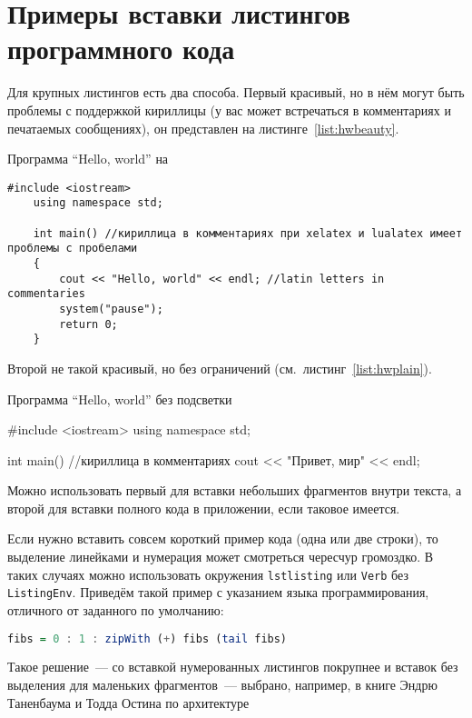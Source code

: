 \iffalse
\chapter{Примеры вставки листингов программного кода} \label{AppendixA}

Для крупных листингов есть два способа. Первый красивый, но в нём могут быть проблемы с поддержкой кириллицы (у вас может встречаться в комментариях и
печатаемых сообщениях), он представлен на листинге~\ref{list:hwbeauty}.
\begin{ListingEnv}[!h]%
    \caption{Программа “Hello, world” на \protect\cpp}
    \label{list:hwbeauty}
    \begin{lstlisting}[language={[ISO]C++}]
	#include <iostream>
	using namespace std;

	int main() //кириллица в комментариях при xelatex и lualatex имеет проблемы с пробелами
	{
		cout << "Hello, world" << endl; //latin letters in commentaries
		system("pause");
		return 0;
	}
    \end{lstlisting}
\end{ListingEnv}%
Второй не такой красивый, но без ограничений (см.~листинг~\ref{list:hwplain}).
\begin{ListingEnv}[!h]
    \caption{Программа “Hello, world” без подсветки}
    \label{list:hwplain}
    \begin{Verb}
        
        #include <iostream>
        using namespace std;
        
        int main() //кириллица в комментариях
        {
            cout << "Привет, мир" << endl;
        }
    \end{Verb}
\end{ListingEnv}

Можно использовать первый для вставки небольших фрагментов
внутри текста, а второй для вставки полного
кода в приложении, если таковое имеется.

Если нужно вставить совсем короткий пример кода (одна или две строки), то выделение  линейками и нумерация может смотреться чересчур громоздко. В таких случаях можно использовать окружения \texttt{lstlisting} или \texttt{Verb} без \texttt{ListingEnv}. Приведём такой пример с указанием языка программирования, отличного от заданного по умолчанию:
\begin{lstlisting}[language=Haskell]
fibs = 0 : 1 : zipWith (+) fibs (tail fibs)
\end{lstlisting}
Такое решение~--- со вставкой нумерованных листингов покрупнее
и вставок без выделения для маленьких фрагментов~--- выбрано,
например, в книге Эндрю Таненбаума и Тодда Остина по архитектуре

